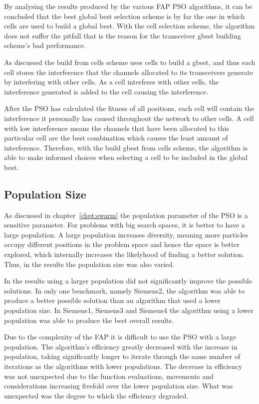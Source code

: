 By analysing the results produced by the various FAP PSO algorithms, it can be concluded that the best global best selection scheme is by far the one in which cells are used to build a global best. With the cell selection scheme, the algorithm does not suffer the pitfall that is the reason for the transceiver gbest building scheme's bad performance.

As discussed the build from cells scheme uses cells to build a gbest, and thus each cell stores the interference that the channels allocated to its transceivers generate by interfering with other cells. As a cell interferes with other cells, the interference generated is added to the cell causing the interference.

After the PSO has calculated the fitness of all positions, each cell will contain the interference it personally has caused throughout the network to other cells. A cell with low interference means the channels that have been allocated to this particular cell are the best combination which causes the least amount of interference. Therefore, with the build gbest from cells scheme, the algorithm is able to make informed choices when selecting a cell to be included in the global best. 
\subsection{Population Size}
As discussed in chapter~\ref{chpt:swarm} the population parameter of the PSO is a sensitive parameter. For problems with big search spaces, it is better to have a large population. A large population increases diversity, meaning more particles occupy different positions in the problem space and hence the space is better explored, which internally increases the likelyhood of finding a better solution. Thus, in the results the population size was also varied.

In the results using a larger population did not significantly improve the possible solutions. In only one benchmark, namely Siemens2, the algorithm was able to produce a better possible solution than an algorithm that used a lower population size. In Siemens1, Siemens3 and Siemens4 the algorithm using a lower population was able to produce the best overall results.

Due to the complexity of the FAP it is difficult to use the PSO with a large population. The algorithm's efficiency greatly decreased with the increase in population, taking significantly longer to iterate through the same number of iterations as the algorithms with lower populations. The decrease in efficiency was not unexpected due to the function evaluations, movements and considerations increasing fivefold over the lower population size. What was unexpected was the degree to which the efficiency degraded.
